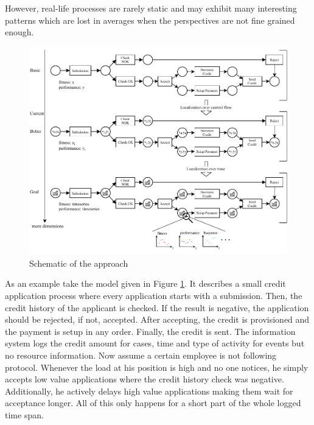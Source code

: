 However, real-life processes are rarely static and may exhibit many interesting patterns which are lost in averages when the perspectives are not fine grained enough.
\begin{figure}
    \centering
    \includegraphics[width=\textwidth]{figures/introduction/bigschematic_v3.pdf}
    \caption{Schematic of the approach}
    \label{fig:bigschematic}
\end{figure}
As an example take the model given in Figure \ref{fig:bigschematic}. It describes a small credit application process where every application starts with a submission. Then, the credit history of the applicant is checked. If the result is negative, the application should be rejected, if not, accepted. After accepting, the credit is provisioned and the payment is setup in any order. Finally, the credit is sent. The information system logs the credit amount for cases, time and type of activity for events but no resource information. Now assume a certain employee is not following protocol. Whenever the load at his position is high and no one notices, he simply accepts low value applications where the credit history check was negative. Additionally, he actively delays high value applications making them wait for acceptance longer. All of this only happens for a short part of the whole logged time span.

